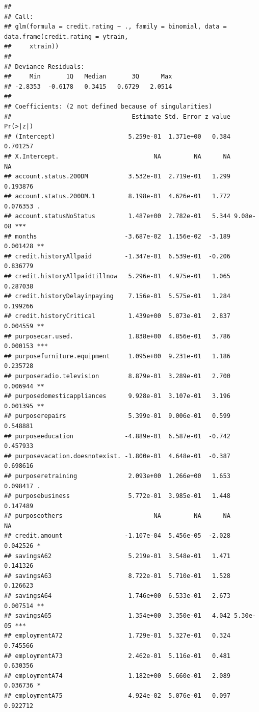 \documentclass[]{book}
\begin{document}
\begin{verbatim}
## 
## Call:
## glm(formula = credit.rating ~ ., family = binomial, data = data.frame(credit.rating = ytrain, 
##     xtrain))
## 
## Deviance Residuals: 
##     Min       1Q   Median       3Q      Max  
## -2.8353  -0.6178   0.3415   0.6729   2.0514  
## 
## Coefficients: (2 not defined because of singularities)
##                                 Estimate Std. Error z value Pr(>|z|)    
## (Intercept)                    5.259e-01  1.371e+00   0.384 0.701257    
## X.Intercept.                          NA         NA      NA       NA    
## account.status.200DM           3.532e-01  2.719e-01   1.299 0.193876    
## account.status.200DM.1         8.198e-01  4.626e-01   1.772 0.076353 .  
## account.statusNoStatus         1.487e+00  2.782e-01   5.344 9.08e-08 ***
## months                        -3.687e-02  1.156e-02  -3.189 0.001428 ** 
## credit.historyAllpaid         -1.347e-01  6.539e-01  -0.206 0.836779    
## credit.historyAllpaidtillnow   5.296e-01  4.975e-01   1.065 0.287038    
## credit.historyDelayinpaying    7.156e-01  5.575e-01   1.284 0.199266    
## credit.historyCritical         1.439e+00  5.073e-01   2.837 0.004559 ** 
## purposecar.used.               1.838e+00  4.856e-01   3.786 0.000153 ***
## purposefurniture.equipment     1.095e+00  9.231e-01   1.186 0.235728    
## purposeradio.television        8.879e-01  3.289e-01   2.700 0.006944 ** 
## purposedomesticappliances      9.928e-01  3.107e-01   3.196 0.001395 ** 
## purposerepairs                 5.399e-01  9.006e-01   0.599 0.548881    
## purposeeducation              -4.889e-01  6.587e-01  -0.742 0.457933    
## purposevacation.doesnotexist. -1.800e-01  4.648e-01  -0.387 0.698616    
## purposeretraining              2.093e+00  1.266e+00   1.653 0.098417 .  
## purposebusiness                5.772e-01  3.985e-01   1.448 0.147489    
## purposeothers                         NA         NA      NA       NA    
## credit.amount                 -1.107e-04  5.456e-05  -2.028 0.042526 *  
## savingsA62                     5.219e-01  3.548e-01   1.471 0.141326    
## savingsA63                     8.722e-01  5.710e-01   1.528 0.126623    
## savingsA64                     1.746e+00  6.533e-01   2.673 0.007514 ** 
## savingsA65                     1.354e+00  3.350e-01   4.042 5.30e-05 ***
## employmentA72                  1.729e-01  5.327e-01   0.324 0.745566    
## employmentA73                  2.462e-01  5.116e-01   0.481 0.630356    
## employmentA74                  1.182e+00  5.660e-01   2.089 0.036736 *  
## employmentA75                  4.924e-02  5.076e-01   0.097 0.922712    

\end{verbatim}
\end{document}
